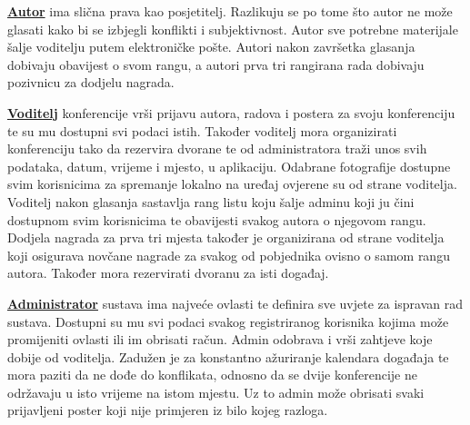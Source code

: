 		\textbf{\underline{Autor}} ima slična prava kao posjetitelj. Razlikuju se po tome što autor ne može glasati kako bi se izbjegli konflikti i subjektivnost. Autor sve potrebne materijale šalje voditelju putem elektroničke pošte. Autori nakon završetka glasanja dobivaju obavijest o svom rangu, a autori prva tri rangirana rada dobivaju pozivnicu za dodjelu nagrada.

		\textbf{\underline{Voditelj}} konferencije vrši prijavu autora, radova i postera za svoju konferenciju te su mu dostupni svi podaci istih. Također voditelj mora organizirati konferenciju tako da rezervira dvorane te od administratora traži unos svih podataka, datum, vrijeme i mjesto, u aplikaciju. Odabrane fotografije dostupne svim korisnicima za spremanje lokalno na uređaj ovjerene su od strane voditelja. Voditelj nakon glasanja sastavlja rang listu koju šalje adminu koji ju čini dostupnom svim korisnicima te obavijesti svakog autora o njegovom rangu. Dodjela nagrada za prva tri mjesta također je organizirana od strane voditelja koji osigurava novčane nagrade za svakog od pobjednika ovisno o samom rangu autora. Također mora rezervirati dvoranu za isti događaj.

		\textbf{\underline{Administrator}} sustava ima najveće ovlasti te definira sve uvjete za ispravan rad sustava. Dostupni su mu svi podaci svakog registriranog korisnika kojima može promijeniti ovlasti ili im obrisati račun. Admin odobrava i vrši zahtjeve koje dobije od voditelja. Zadužen je za konstantno ažuriranje kalendara događaja te mora paziti da ne dođe do konflikata, odnosno da se dvije konferencije ne održavaju u isto vrijeme na istom mjestu. Uz to admin može obrisati svaki prijavljeni poster koji nije primjeren iz bilo kojeg razloga.
		

				

		
	